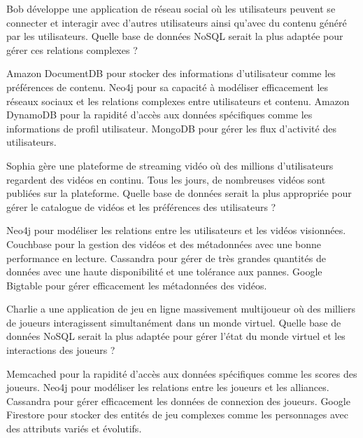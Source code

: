 \documentclass[12pt,a4paper,addpoints,answers]{exam}
\begin{document}
\begin{questions}
		\question[1] Bob développe une application de réseau social où les utilisateurs peuvent se connecter et interagir avec d'autres utilisateurs ainsi qu'avec du contenu généré par les utilisateurs. Quelle base de données NoSQL serait la plus adaptée pour gérer ces relations complexes ?
		\begin{checkboxes}
			\choice Amazon DocumentDB pour stocker des informations d'utilisateur comme les préférences de contenu.
			\CorrectChoice Neo4j pour sa capacité à modéliser efficacement les réseaux sociaux et les relations complexes entre utilisateurs et contenu.
			\choice Amazon DynamoDB pour la rapidité d'accès aux données spécifiques comme les informations de profil utilisateur.
			\choice MongoDB pour gérer les flux d'activité des utilisateurs.
		\end{checkboxes}
		
		\question[1] Sophia gère une plateforme de streaming vidéo où des millions d'utilisateurs regardent des vidéos en continu. Tous les jours, de nombreuses vidéos sont publiées sur la plateforme. Quelle base de données serait la plus appropriée pour gérer le catalogue de vidéos et les préférences des utilisateurs ?
		\begin{checkboxes}
			\choice Neo4j pour modéliser les relations entre les utilisateurs et les vidéos visionnées.
			\choice Couchbase pour la gestion des vidéos et des métadonnées avec une bonne performance en lecture.
			\CorrectChoice Cassandra pour gérer de très grandes quantités de données avec une haute disponibilité et une tolérance aux pannes.
			\choice Google Bigtable pour gérer efficacement les métadonnées des vidéos.
		\end{checkboxes}
		
		\question[1] Charlie a une application de jeu en ligne massivement multijoueur où des milliers de joueurs interagissent simultanément dans un monde virtuel. Quelle base de données NoSQL serait la plus adaptée pour gérer l'état du monde virtuel et les interactions des joueurs ?
		\begin{checkboxes}
			\choice Memcached pour la rapidité d'accès aux données spécifiques comme les scores des joueurs.
			\choice Neo4j pour modéliser les relations entre les joueurs et les alliances.
			\choice Cassandra pour gérer efficacement les données de connexion des joueurs.
			\CorrectChoice Google Firestore pour stocker des entités de jeu complexes comme les personnages avec des attributs variés et évolutifs.
		\end{checkboxes}
		

\end{questions}
\end{document}
